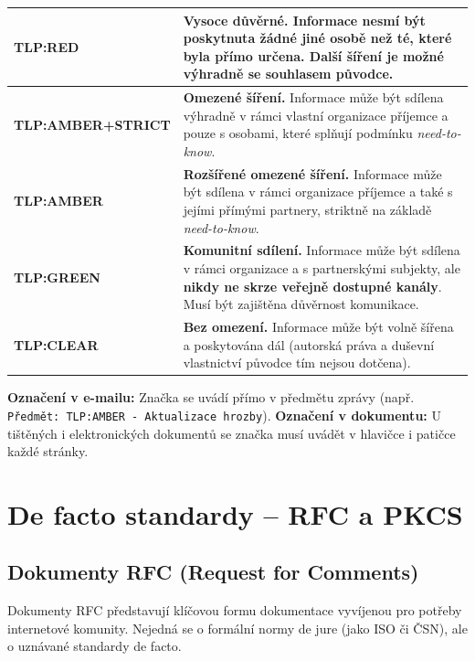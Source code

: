\documentclass[10pt,a4paper]{article}
\begin{document}
	\begin{center}
		\small
		\begin{tabular}{|l|p{9.0cm}|}
			\hline
			\textbf{TLP:RED} & \textbf{Vysoce důvěrné.} Informace nesmí být poskytnuta žádné jiné osobě než té, které byla přímo určena. Další šíření je možné výhradně se souhlasem původce. \\ \hline
			\textbf{TLP:AMBER+STRICT} & \textbf{Omezené šíření.} Informace může být sdílena výhradně v rámci vlastní organizace příjemce a pouze s osobami, které splňují podmínku \textit{need-to-know}. \\ \hline
			\textbf{TLP:AMBER} & \textbf{Rozšířené omezené šíření.} Informace může být sdílena v rámci organizace příjemce a také s jejími přímými partnery, striktně na základě \textit{need-to-know}. \\ \hline
			\textbf{TLP:GREEN} & \textbf{Komunitní sdílení.} Informace může být sdílena v rámci organizace a s partnerskými subjekty, ale \textbf{nikdy ne skrze veřejně dostupné kanály}. Musí být zajištěna důvěrnost komunikace. \\ \hline
			\textbf{TLP:CLEAR} & \textbf{Bez omezení.} Informace může být volně šířena a poskytována dál (autorská práva a duševní vlastnictví původce tím nejsou dotčena). \\ \hline
		\end{tabular}
	\end{center}
	
	\textbf{Označení v e-mailu:} Značka se uvádí přímo v předmětu zprávy (např. \texttt{Předmět: TLP:AMBER - Aktualizace hrozby}).
	\textbf{Označení v dokumentu:} U tištěných i elektronických dokumentů se značka musí uvádět v hlavičce i patičce každé stránky.
	
	
	\section{De facto standardy – RFC a PKCS}
	
	\subsection{Dokumenty RFC (Request for Comments)}
	Dokumenty RFC představují klíčovou formu dokumentace vyvíjenou pro potřeby internetové komunity. Nejedná se o formální normy de jure (jako ISO či ČSN), ale o uznávané standardy de facto. 
	
\end{document}
